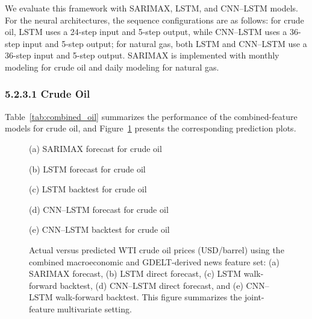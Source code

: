 \documentclass[pdflatex,sn-mathphys-num]{sn-jnl}%
\theoremstyle{thmstyleone}%
\theoremstyle{thmstyletwo}%
\theoremstyle{thmstylethree}%
\begin{document}
We evaluate this framework with SARIMAX, LSTM, and CNN--LSTM models. For the neural architectures, the sequence configurations are as follows: for crude oil, LSTM uses a 24-step input and 5-step output, while CNN--LSTM uses a 36-step input and 5-step output; for natural gas, both LSTM and CNN--LSTM use a 36-step input and 5-step output. SARIMAX is implemented with monthly modeling for crude oil and daily modeling for natural gas.

\subsubsection*{5.2.3.1 Crude Oil}
Table~\ref{tab:combined_oil} summarizes the performance of the combined-feature models for crude oil, and Figure~\ref{fig:combined_oil_plots} presents the corresponding prediction plots.

\begin{figure}[h]
\centering
\begin{minipage}[t]{0.495\textwidth}
\centering

\small (a) SARIMAX forecast for crude oil
\end{minipage}\hfill
\begin{minipage}[t]{0.495\textwidth}
\centering

\small (b) LSTM forecast for crude oil
\end{minipage}

\vspace{0.5em}

\begin{minipage}[t]{0.495\textwidth}
\centering

\small (c) LSTM backtest for crude oil
\end{minipage}\hfill
\begin{minipage}[t]{0.495\textwidth}
\centering

\small (d) CNN--LSTM forecast for crude oil
\end{minipage}

\vspace{0.5em}

\begin{minipage}[t]{0.495\textwidth}
\centering

\small (e) CNN--LSTM backtest for crude oil
\end{minipage}
\caption{Actual versus predicted WTI crude oil prices (USD/barrel) using the combined macroeconomic and GDELT-derived news feature set: (a) SARIMAX forecast, (b) LSTM direct forecast, (c) LSTM walk-forward backtest, (d) CNN--LSTM direct forecast, and (e) CNN--LSTM walk-forward backtest. This figure summarizes the joint-feature multivariate setting.}
\label{fig:combined_oil_plots}
\end{figure}
\end{document}
